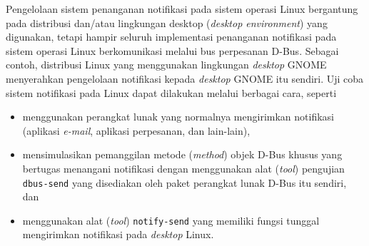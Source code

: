 Pengelolaan sistem penanganan notifikasi pada sistem operasi Linux bergantung pada distribusi dan/atau lingkungan desktop (\textit{desktop environment}) yang digunakan, tetapi hampir seluruh implementasi penanganan notifikasi pada sistem operasi Linux berkomunikasi melalui bus perpesanan D-Bus. Sebagai contoh, distribusi Linux yang menggunakan lingkungan \textit{desktop} GNOME menyerahkan pengelolaan notifikasi kepada \textit{desktop} GNOME itu sendiri. Uji coba sistem notifikasi pada Linux dapat dilakukan melalui berbagai cara, seperti
\begin{itemize}
    \item menggunakan perangkat lunak yang normalnya mengirimkan notifikasi (aplikasi \textit{e-mail}, aplikasi perpesanan, dan lain-lain),
    \item mensimulasikan pemanggilan metode (\textit{method}) objek D-Bus khusus yang bertugas menangani notifikasi dengan menggunakan alat (\textit{tool}) pengujian \verb|dbus-send| yang disediakan oleh paket perangkat lunak D-Bus itu sendiri, dan
    \item menggunakan alat (\textit{tool}) \verb|notify-send| yang memiliki fungsi tunggal mengirimkan notifikasi pada \textit{desktop} Linux.
\end{itemize}


